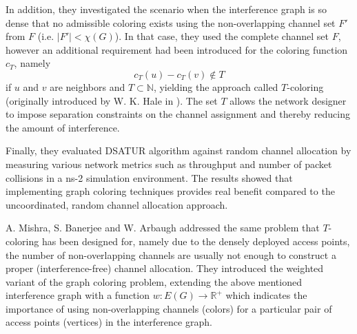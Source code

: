 \documentclass[a4paper, 12pt]{article}
\begin{document}
In addition, they investigated the scenario when the interference graph is so dense that no admissible coloring exists using the non-overlapping channel set $F'$ from $F$ (i.e. $|F'| < \chi(G)$). In that case, they used the complete channel set $F$, however an additional requirement had been introduced for the coloring function $c_T$, namely
$$
c_T(u) - c_T(v) \not\in T
$$
if $u$ and $v$ are neighbors and $T \subset \mathbb{N}$, yielding the approach called $T$-coloring (originally introduced by W. K. Hale in \cite{1456167}). The set $T$ allows the network designer to impose separation constraints on the channel assignment and thereby reducing the amount of interference.

Finally, they evaluated DSATUR algorithm against random channel allocation by measuring various network metrics such as throughput and number of packet collisions in a ns-2 simulation environment. The results showed that implementing graph coloring techniques provides real benefit compared to the uncoordinated, random channel allocation approach.

A. Mishra, S. Banerjee and W. Arbaugh \cite{mishra} addressed the same problem that $T$-coloring has been designed for, namely due to the densely deployed access points, the number of non-overlapping channels are usually not enough to construct a proper (interference-free) channel allocation. They introduced the weighted variant of the graph coloring problem, extending the above mentioned interference graph with a function $w\colon E(G) \to \mathbb{R}^+$ which indicates the importance of using non-overlapping channels (colors) for a particular pair of access points (vertices) in the interference graph.
\end{document}
